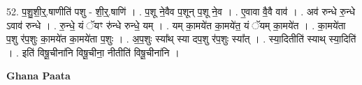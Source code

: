 \documentclass[17pt]{extarticle}
\begin{document}
52. प॒शु॒शी॒र्॒.षाणीति॑ पशु - शी॒र्॒.षाणि॑ । . प॒शू ने॒वैव प॒शून् प॒शू ने॒व । . ए॒वावा वै॒वै वाव॑ । . अव॑ रुन्धे रु॒न्धे ऽवाव॑ रुन्धे । . रु॒न्धे॒ यं ॅयꣳ रु॑न्धे रुन्धे॒ यम् । . यम् का॒मये॑त का॒मये॑त॒ यं ॅयम् का॒मये॑त । . का॒मये॑ता प॒शु र॑प॒शुः का॒मये॑त का॒मये॑ता प॒शुः । . अ॒प॒शुः स्या᳚थ् स्या दप॒शु र॑प॒शुः स्या᳚त् । . स्या॒दितीति॑ स्याथ् स्या॒दिति॑ । . इति॑ विषू॒चीना॑नि विषू॒चीना॒ नीतीति॑ विषू॒चीना॑नि । \newline

\textbf{Ghana Paata } \newline
\end{document}
